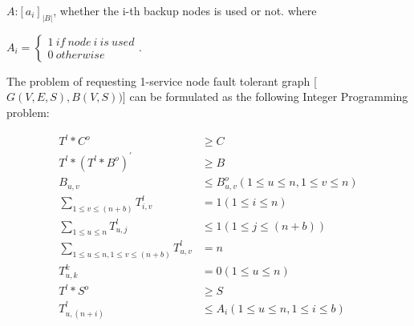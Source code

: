 $A$:$[a_i]_{|B|}$, whether the i-th backup nodes is used or not. where

${A_i}=\left\{ \begin{array}{l}1\ if\ node\ i\ is\ used\\
0\ otherwise
\end{array} \right.$.

The problem of requesting 1-service node fault tolerant graph [$G(V,E,S),B(V,S))$] can be formulated as the following Integer Programming problem:
\begin{center}
\begin{align}
\label{equ:ILPC10} T^l*C^o&\geq C\\
\label{equ:ILPC1} T^l*(T^l* B^o)^{'}&\geq B\\
\label{equ:ILPC7} B_{u,v}&\leq B^o_{u,v}(1\leq u\leq n,1\leq v\leq n)\\
\label{equ:ILPC2} \sum_{1\leq v\leq (n+b)}T^l_{i,v}&= 1 (1\leq i\leq n)\\
\label{equ:ILPC3} \sum_{1\leq u\leq n}T^l_{u,j}&\leq 1 (1\leq j\leq (n+b))  \\
\label{equ:ILPC4} \sum_{1\leq u\leq n,1\leq v\leq (n+b)}T^l_{u,v}&=n \\
\label{equ:ILPC5}  T^k_{u,k}&=0 (1\leq u\leq n)\\
\label{equ:ILPC8} T^l*S^o &\geq S\\
\label{equ:ILPC9} T^l_{u,(n+i)} &\leq A_i(1\leq u\leq n,1\leq i\leq b)\\
\end{align}
\end{center}


